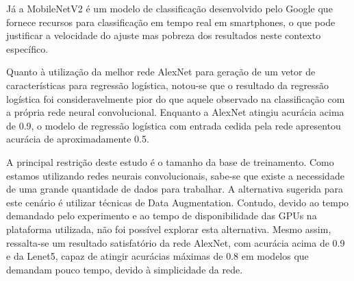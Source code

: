 \documentclass[
	12pt,				%
	openright,			%
	twoside,			%
	a4paper,			%
	english,			%
	brazil,				%
	svgnames
	]{abntex2}\usepackage[]{graphicx}\usepackage[]{color}
\begin{document}
Já a MobileNetV2 é um modelo de classificação desenvolvido pelo Google que fornece recursos para classificação em tempo real em smartphones, o que pode justificar a velocidade do ajuste mas pobreza dos resultados neste contexto específico.

Quanto à utilização da melhor rede AlexNet para geração de um vetor de características para regressão logística, notou-se que o resultado da regressão logística foi consideravelmente pior do que aquele observado na classificação com a própria rede neural convolucional. Enquanto a AlexNet atingiu acurácia acima de 0.9, o modelo de regressão logística com entrada cedida pela rede apresentou acurácia de aproximadamente 0.5.

A principal restrição deste estudo é o tamanho da base de treinamento. Como estamos utilizando redes neurais convolucionais, sabe-se que existe a necessidade de uma grande quantidade de dados para trabalhar. A alternativa sugerida para este cenário é utilizar técnicas de Data Augmentation. Contudo, devido ao tempo demandado pelo experimento e ao tempo de disponibilidade das GPUs na plataforma utilizada, não foi possível explorar esta alternativa. Mesmo assim, ressalta-se um resultado satisfatório da rede AlexNet, com acurácia acima de 0.9 e da Lenet5, capaz de atingir acurácias máximas de 0.8 em modelos que demandam pouco tempo, devido à simplicidade da rede.





\postextual




% 

\end{document}
